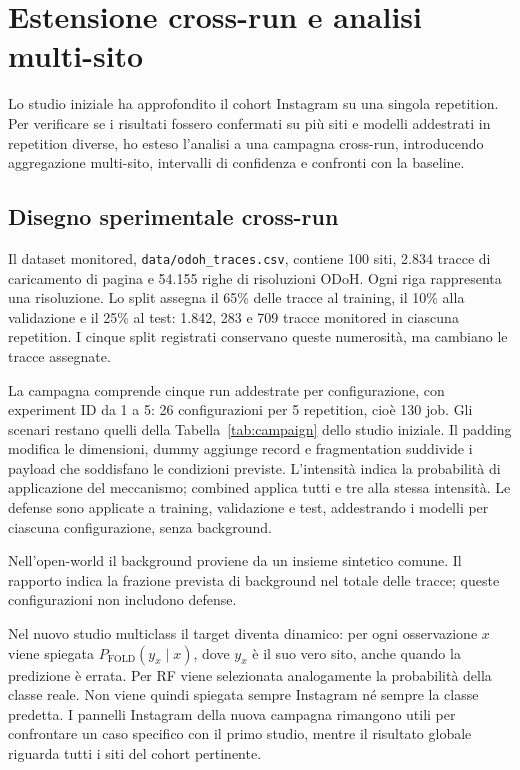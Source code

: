 \documentclass[11pt,a4paper]{article}
\begin{document}
\section{Estensione cross-run e analisi multi-sito}
\label{sec:crossrun-extension}
Lo studio iniziale ha approfondito il cohort Instagram su una singola repetition. Per verificare se i risultati fossero confermati su più siti e modelli addestrati in repetition diverse, ho esteso l'analisi a una campagna cross-run, introducendo aggregazione multi-sito, intervalli di confidenza e confronti con la baseline.

\subsection{Disegno sperimentale cross-run}
Il dataset monitored, \texttt{data/odoh\_traces.csv}, contiene 100 siti, 2.834 tracce di caricamento di pagina e 54.155 righe di risoluzioni ODoH. Ogni riga rappresenta una risoluzione. Lo split assegna il 65\% delle tracce al training, il 10\% alla validazione e il 25\% al test: 1.842, 283 e 709 tracce monitored in ciascuna repetition. I cinque split registrati conservano queste numerosità, ma cambiano le tracce assegnate.

La campagna comprende cinque run addestrate per configurazione, con experiment ID da 1 a 5: 26 configurazioni per 5 repetition, cioè 130 job. Gli scenari restano quelli della Tabella~\ref{tab:campaign} dello studio iniziale. Il padding modifica le dimensioni, dummy aggiunge record e fragmentation suddivide i payload che soddisfano le condizioni previste. L'intensità indica la probabilità di applicazione del meccanismo; combined applica tutti e tre alla stessa intensità. Le defense sono applicate a training, validazione e test, addestrando i modelli per ciascuna configurazione, senza background.

Nell'open-world il background proviene da un insieme sintetico comune. Il rapporto indica la frazione prevista di background nel totale delle tracce; queste configurazioni non includono defense.


Nel nuovo studio multiclass il target diventa dinamico: per ogni osservazione $x$ viene spiegata $P_{\mathrm{FOLD}}(y_x\mid x)$, dove $y_x$ è il suo vero sito, anche quando la predizione è errata. Per RF viene selezionata analogamente la probabilità della classe reale. Non viene quindi spiegata sempre Instagram né sempre la classe predetta. I pannelli Instagram della nuova campagna rimangono utili per confrontare un caso specifico con il primo studio, mentre il risultato globale riguarda tutti i siti del cohort pertinente.
\end{document}
